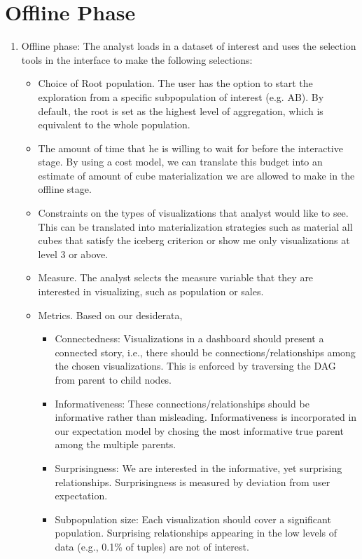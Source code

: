\documentclass[11pt]{article}
\begin{document}
\section*{Offline Phase}
\begin{enumerate}
\item  Offline phase: The analyst loads in a dataset of interest and uses the selection tools in the interface to make the following selections:
\begin{itemize}
\item Choice of Root population. The user has the option to start the exploration from a specific subpopulation of interest (e.g. AB). By default, the root is set as the highest level of aggregation, which is equivalent to the whole population.
\item  The amount of time that he is willing to wait for before the interactive stage. By using a cost model, we can translate this budget into an estimate of amount of cube materialization we are allowed to make in the offline stage. 
\item Constraints on the types of visualizations that analyst would like to see. This can be translated into materialization strategies such as material all cubes that satisfy the iceberg criterion or show me only visualizations at level 3 or above.
\item Measure. The analyst selects the measure variable that they are interested in visualizing, such as population or sales.
\item Metrics. Based on our desiderata, 
  \begin{itemize}
    \item Connectedness: Visualizations in a dashboard should present a connected story, i.e., there should be connections/relationships among the chosen visualizations. This is enforced by traversing the DAG from parent to child nodes.
    \item Informativeness: These connections/relationships should be informative rather than misleading. Informativeness is incorporated in our expectation model by chosing the most informative true parent among the multiple parents.
    \item Surprisingness: We are interested in the informative, yet surprising relationships. Surprisingness is measured by deviation from user expectation.
    \item Subpopulation size: Each visualization should cover a significant population. Surprising relationships appearing in the low levels of data (e.g., 0.1\% of tuples) are not of interest.

\end{itemize}
\end{itemize}
\end{enumerate}
\end{document}
